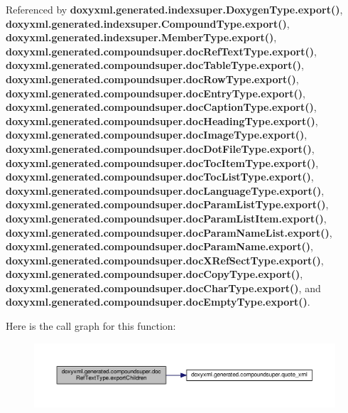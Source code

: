 Referenced by {\bf doxyxml.\+generated.\+indexsuper.\+Doxygen\+Type.\+export()}, {\bf doxyxml.\+generated.\+indexsuper.\+Compound\+Type.\+export()}, {\bf doxyxml.\+generated.\+indexsuper.\+Member\+Type.\+export()}, {\bf doxyxml.\+generated.\+compoundsuper.\+doc\+Ref\+Text\+Type.\+export()}, {\bf doxyxml.\+generated.\+compoundsuper.\+doc\+Table\+Type.\+export()}, {\bf doxyxml.\+generated.\+compoundsuper.\+doc\+Row\+Type.\+export()}, {\bf doxyxml.\+generated.\+compoundsuper.\+doc\+Entry\+Type.\+export()}, {\bf doxyxml.\+generated.\+compoundsuper.\+doc\+Caption\+Type.\+export()}, {\bf doxyxml.\+generated.\+compoundsuper.\+doc\+Heading\+Type.\+export()}, {\bf doxyxml.\+generated.\+compoundsuper.\+doc\+Image\+Type.\+export()}, {\bf doxyxml.\+generated.\+compoundsuper.\+doc\+Dot\+File\+Type.\+export()}, {\bf doxyxml.\+generated.\+compoundsuper.\+doc\+Toc\+Item\+Type.\+export()}, {\bf doxyxml.\+generated.\+compoundsuper.\+doc\+Toc\+List\+Type.\+export()}, {\bf doxyxml.\+generated.\+compoundsuper.\+doc\+Language\+Type.\+export()}, {\bf doxyxml.\+generated.\+compoundsuper.\+doc\+Param\+List\+Type.\+export()}, {\bf doxyxml.\+generated.\+compoundsuper.\+doc\+Param\+List\+Item.\+export()}, {\bf doxyxml.\+generated.\+compoundsuper.\+doc\+Param\+Name\+List.\+export()}, {\bf doxyxml.\+generated.\+compoundsuper.\+doc\+Param\+Name.\+export()}, {\bf doxyxml.\+generated.\+compoundsuper.\+doc\+X\+Ref\+Sect\+Type.\+export()}, {\bf doxyxml.\+generated.\+compoundsuper.\+doc\+Copy\+Type.\+export()}, {\bf doxyxml.\+generated.\+compoundsuper.\+doc\+Char\+Type.\+export()}, and {\bf doxyxml.\+generated.\+compoundsuper.\+doc\+Empty\+Type.\+export()}.



Here is the call graph for this function\+:
\nopagebreak
\begin{figure}[H]
\begin{center}
\leavevmode
\includegraphics[width=350pt]{d6/d3c/classdoxyxml_1_1generated_1_1compoundsuper_1_1docRefTextType_a803ee9de5e7efd8d4b25632f1bb1c6b9_cgraph}
\end{center}
\end{figure}




